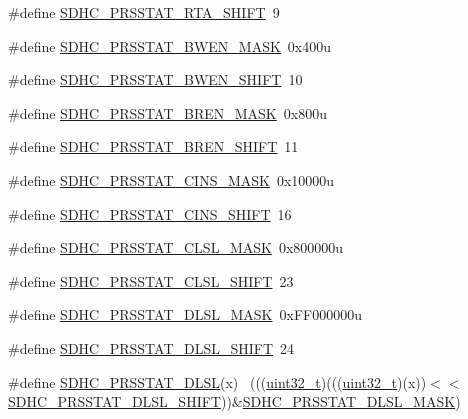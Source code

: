 \begin{DoxyCompactItemize}
\item 
\#define \hyperlink{group___s_d_h_c___register___masks_gaad64c483eb2e6b6fc96cd466772b1af5}{S\+D\+H\+C\+\_\+\+P\+R\+S\+S\+T\+A\+T\+\_\+\+R\+T\+A\+\_\+\+S\+H\+I\+FT}~9
\item 
\#define \hyperlink{group___s_d_h_c___register___masks_ga59c9cd5ee08a703b51a4487e721cfdac}{S\+D\+H\+C\+\_\+\+P\+R\+S\+S\+T\+A\+T\+\_\+\+B\+W\+E\+N\+\_\+\+M\+A\+SK}~0x400u
\item 
\#define \hyperlink{group___s_d_h_c___register___masks_ga2a8af22b9f8230f46db9118a7f4a2f62}{S\+D\+H\+C\+\_\+\+P\+R\+S\+S\+T\+A\+T\+\_\+\+B\+W\+E\+N\+\_\+\+S\+H\+I\+FT}~10
\item 
\#define \hyperlink{group___s_d_h_c___register___masks_ga9a1a3466ff4e6ec9067956296e917ebf}{S\+D\+H\+C\+\_\+\+P\+R\+S\+S\+T\+A\+T\+\_\+\+B\+R\+E\+N\+\_\+\+M\+A\+SK}~0x800u
\item 
\#define \hyperlink{group___s_d_h_c___register___masks_ga755afbadcc686b9a04f531081c5fb811}{S\+D\+H\+C\+\_\+\+P\+R\+S\+S\+T\+A\+T\+\_\+\+B\+R\+E\+N\+\_\+\+S\+H\+I\+FT}~11
\item 
\#define \hyperlink{group___s_d_h_c___register___masks_ga48dc8b20e5092e223a378a1cba4803d1}{S\+D\+H\+C\+\_\+\+P\+R\+S\+S\+T\+A\+T\+\_\+\+C\+I\+N\+S\+\_\+\+M\+A\+SK}~0x10000u
\item 
\#define \hyperlink{group___s_d_h_c___register___masks_ga3aaccd62a11f1cd2f842cd8d5f50ba79}{S\+D\+H\+C\+\_\+\+P\+R\+S\+S\+T\+A\+T\+\_\+\+C\+I\+N\+S\+\_\+\+S\+H\+I\+FT}~16
\item 
\#define \hyperlink{group___s_d_h_c___register___masks_gab76b324ebb0b2d882ac0f8a1f563647d}{S\+D\+H\+C\+\_\+\+P\+R\+S\+S\+T\+A\+T\+\_\+\+C\+L\+S\+L\+\_\+\+M\+A\+SK}~0x800000u
\item 
\#define \hyperlink{group___s_d_h_c___register___masks_ga321c503ac2679cd51a2a30219a33d951}{S\+D\+H\+C\+\_\+\+P\+R\+S\+S\+T\+A\+T\+\_\+\+C\+L\+S\+L\+\_\+\+S\+H\+I\+FT}~23
\item 
\#define \hyperlink{group___s_d_h_c___register___masks_gacc5e74fd893e00bf8d48d3ad7165de0a}{S\+D\+H\+C\+\_\+\+P\+R\+S\+S\+T\+A\+T\+\_\+\+D\+L\+S\+L\+\_\+\+M\+A\+SK}~0x\+F\+F000000u
\item 
\#define \hyperlink{group___s_d_h_c___register___masks_ga6c5c346e4671cdebd3a2132924f059a1}{S\+D\+H\+C\+\_\+\+P\+R\+S\+S\+T\+A\+T\+\_\+\+D\+L\+S\+L\+\_\+\+S\+H\+I\+FT}~24
\item 
\#define \hyperlink{group___s_d_h_c___register___masks_ga942a5be77bd4140272cb30a4b36686f8}{S\+D\+H\+C\+\_\+\+P\+R\+S\+S\+T\+A\+T\+\_\+\+D\+L\+SL}(x)                                      ~(((\hyperlink{_p_e___types_8h_a33594304e786b158f3fb30289278f5af}{uint32\+\_\+t})(((\hyperlink{_p_e___types_8h_a33594304e786b158f3fb30289278f5af}{uint32\+\_\+t})(x))$<$$<$\hyperlink{group___s_d_h_c___register___masks_ga6c5c346e4671cdebd3a2132924f059a1}{S\+D\+H\+C\+\_\+\+P\+R\+S\+S\+T\+A\+T\+\_\+\+D\+L\+S\+L\+\_\+\+S\+H\+I\+FT}))\&\hyperlink{group___s_d_h_c___register___masks_gacc5e74fd893e00bf8d48d3ad7165de0a}{S\+D\+H\+C\+\_\+\+P\+R\+S\+S\+T\+A\+T\+\_\+\+D\+L\+S\+L\+\_\+\+M\+A\+SK})
$$
\end{DoxyCompactItemize}
